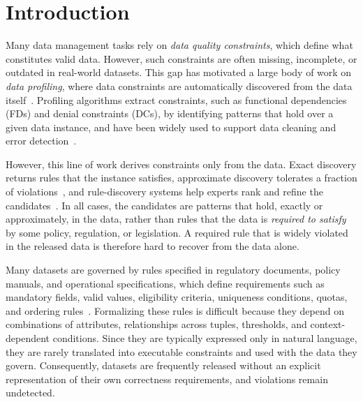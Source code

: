 \section{Introduction}
\label{sec:intro}

Many data management tasks rely on \emph{data quality constraints}, which define what constitutes valid data.
However, such constraints are often missing, incomplete, or outdated in real-world datasets. This gap has motivated a large body of work on \emph{data profiling}, where data constraints are automatically discovered from the data itself~\cite{profSurveyFelix2015}. 
Profiling algorithms extract constraints, such as functional dependencies (FDs) and denial constraints (DCs), by identifying patterns that hold over a given data instance, and have been widely used to support data cleaning and error detection~\cite{dependencyTree2020}.

However, this line of work derives constraints only from the data. Exact discovery returns rules that the instance satisfies, approximate discovery tolerates a fraction of violations~\cite{Pena2019DiscoveryDC,martin2026lima}, and rule-discovery systems help experts rank and refine the candidates~\cite{fan2023topk}. In all cases, the candidates are patterns that hold, exactly or approximately, in the data, rather than rules that the data is \emph{required to satisfy} by some policy, regulation, or legislation. A required rule that is widely violated in the released data is therefore hard to recover from the data alone.

Many datasets are governed by rules specified in regulatory documents, policy manuals, and operational specifications, which define requirements such as mandatory fields, valid values, eligibility criteria, uniqueness conditions, quotas, and ordering rules~\cite{batini2009methodologies,serra2024IQcontextDtaQuality,CABALLERO2022102058}. Formalizing these rules is difficult because they depend on combinations of attributes, relationships across tuples, thresholds, and context-dependent conditions. Since they are typically expressed only in natural language, they are rarely translated into executable constraints and used with the data they govern. Consequently, datasets are frequently released without an explicit representation of their own correctness requirements, and violations remain undetected.

